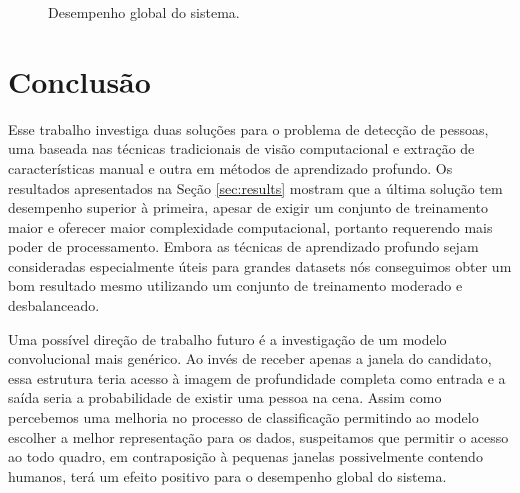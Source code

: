     \begin{figure*}[!t]
    \centering
    \label{fig:result-system-all}
    \hfil
    \label{fig:result-system-all-zoom}
    \caption{Desempenho global do sistema.}
    \label{fig:result-system}
    \end{figure*}

\section{Conclusão}
\label{sec:conclusion}

    Esse trabalho investiga duas soluções para o problema de detecção de pessoas, uma baseada nas técnicas tradicionais de visão computacional e extração de características manual e outra em métodos de aprendizado profundo. Os resultados apresentados na Seção \ref{sec:results} mostram que a última solução tem desempenho superior à primeira, apesar de exigir um conjunto de treinamento maior e oferecer maior complexidade computacional, portanto requerendo mais poder de processamento. Embora as técnicas de aprendizado profundo sejam consideradas especialmente úteis para grandes datasets nós conseguimos obter um bom resultado mesmo utilizando um conjunto de treinamento moderado e desbalanceado.

    Uma possível direção de trabalho futuro é a investigação de um modelo convolucional mais genérico. Ao invés de receber apenas a janela do candidato, essa estrutura teria acesso à imagem de profundidade completa como entrada e a saída seria a probabilidade de existir uma pessoa na cena. Assim como percebemos uma melhoria no processo de classificação permitindo ao modelo escolher a melhor representação para os dados, suspeitamos que permitir o acesso ao todo quadro, em contraposição à pequenas janelas possivelmente contendo humanos, terá um efeito positivo para o desempenho global do sistema.

